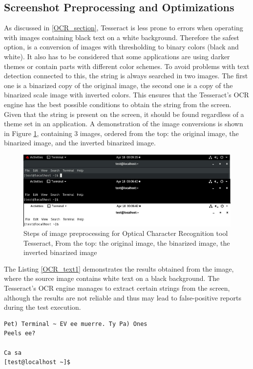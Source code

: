 \subsection{Screenshot Preprocessing and Optimizations}
As discussed in \ref{OCR_section}, Tesseract is less prone to errors when operating with images containing black text on a white background. Therefore the safest option, is a conversion of images with thresholding to binary colors (black and white). It also has to be considered that some applications are using darker themes or contain parts with different color schemes. To avoid problems with text detection connected to this, the string is always searched in two images. The first one is a binarized copy of the original image, the second one is a copy of the binarized scale image with inverted colors. This ensures that the Tesseract's OCR engine has the best possible conditions to obtain the string from the screen. Given that the string is present on the screen, it should be found regardless of a theme set in an application. A demonstration of the image conversions is shown in Figure \ref{ocr_conversion}, containing 3 images, ordered from the top: the original image, the binarized image, and the inverted binarized image. 

\begin{figure}[H]
	\centering
	\includegraphics[width=1\textwidth,clip]{obrazky-figures/OCR_conversion.jpg}
	\caption{Steps of image preprocessing for Optical Character Recognition tool Tesseract, From the top: the original image, the binarized image, the inverted binarized image}
	\label{ocr_conversion}
\end{figure}

The Listing \ref{OCR_text1} demonstrates the results obtained from the image, where the source image contains white text on a black background. The Tesseract's OCR engine manages to extract certain strings from the screen, although the results are not reliable and thus may lead to false-positive reports during the test execution.  

\begin{lstlisting}[caption={Text generated from the binarized image in Figure \ref{ocr_conversion}},label={OCR_text1}]
Pet) Terminal ~ EV ee muerre. Ty Pa) Ones
Peels ee?

Ca sa
[test@localhost ~]$ 
\end{lstlisting}

